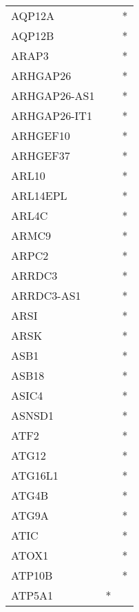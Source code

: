 \begin{longtable}{lcc}
AQP12A          &                &          * \\
AQP12B          &                &          * \\
ARAP3           &                &          * \\
ARHGAP26        &                &          * \\
ARHGAP26-AS1    &                &          * \\
ARHGAP26-IT1    &                &          * \\
ARHGEF10        &                &          * \\
ARHGEF37        &                &          * \\
ARL10           &                &          * \\
ARL14EPL        &                &          * \\
ARL4C           &                &          * \\
ARMC9           &                &          * \\
ARPC2           &                &          * \\
ARRDC3          &                &          * \\
ARRDC3-AS1      &                &          * \\
ARSI            &                &          * \\
ARSK            &                &          * \\
ASB1            &                &          * \\
ASB18           &                &          * \\
ASIC4           &                &          * \\
ASNSD1          &                &          * \\
ATF2            &                &          * \\
ATG12           &                &          * \\
ATG16L1         &                &          * \\
ATG4B           &                &          * \\
ATG9A           &                &          * \\
ATIC            &                &          * \\
ATOX1           &                &          * \\
ATP10B          &                &          * \\
ATP5A1          &              * &            \\

\end{longtable}

